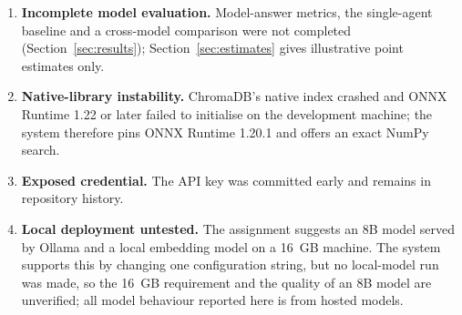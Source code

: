 \documentclass[10pt,a4paper]{article}
\begin{document}
\begin{enumerate}
  \item \textbf{Incomplete model evaluation.} Model-answer metrics, the single-agent baseline and a cross-model comparison were not completed (Section~\ref{sec:results}); Section~\ref{sec:estimates} gives illustrative point estimates only.
  \item \textbf{Native-library instability.} ChromaDB's native index crashed and ONNX Runtime 1.22 or later failed to initialise on the development machine; the system therefore pins ONNX Runtime 1.20.1 and offers an exact NumPy search.
  \item \textbf{Exposed credential.} The API key was committed early and remains in repository history.
  \item \textbf{Local deployment untested.} The assignment suggests an 8B model served by Ollama and a local embedding model on a 16~GB machine. The system supports this by changing one configuration string, but no local-model run was made, so the 16~GB requirement and the quality of an 8B model are unverified; all model behaviour reported here is from hosted models.
\end{enumerate}

\end{document}
